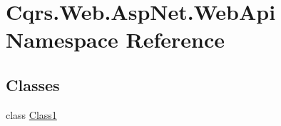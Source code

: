 \hypertarget{namespaceCqrs_1_1Web_1_1AspNet_1_1WebApi}{}\section{Cqrs.\+Web.\+Asp\+Net.\+Web\+Api Namespace Reference}
\label{namespaceCqrs_1_1Web_1_1AspNet_1_1WebApi}
\subsection*{Classes}
\begin{DoxyCompactItemize}
\item 
class \hyperlink{classCqrs_1_1Web_1_1AspNet_1_1WebApi_1_1Class1}{Class1}
\end{DoxyCompactItemize}
